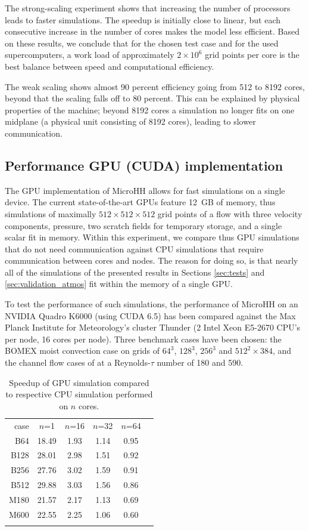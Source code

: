 \documentclass[gmd,manuscript]{copernicus}
\begin{document}
The strong-scaling experiment shows that increasing the number of processors leads to faster simulations. The speedup is initially close to linear, but each consecutive increase in the number of cores makes the model less efficient. Based on these results, we conclude that for the chosen test case and for the used supercomputers, a work load of approximately $2 \times 10^6$ grid points per core is the best balance between speed and computational efficiency.

The weak scaling shows almost 90 percent efficiency going from 512 to 8192 cores, beyond that the scaling falls off to 80 percent. This can be explained by physical properties of the machine;  beyond 8192 cores a simulation no longer fits on one midplane (a physical unit consisting of 8192 cores), leading to slower communication.

\subsection{Performance GPU (CUDA) implementation}
The GPU implementation of MicroHH allows for fast simulations on a single device. The current state-of-the-art GPUs feature 12~GB of memory, thus simulations of maximally $512 \times 512 \times 512$ grid points of a flow with three velocity components, pressure, two scratch fields for temporary storage, and a single scalar fit in memory. Within this experiment, we compare thus GPU simulations that do not need communication against CPU simulations that require communication between cores and nodes. The reason for doing so, is that nearly all of the simulations of the presented results in Sections \ref{sec:tests} and \ref{sec:validation_atmos} fit within the memory of a single GPU.

To test the performance of such simulations, the performance of MicroHH on an NVIDIA Quadro K6000 (using CUDA 6.5) has been compared against the Max Planck Institute for Meteorology's cluster Thunder (2 Intel Xeon E5-2670 CPU's per node, 16 cores per node). Three benchmark cases have been chosen: the BOMEX moist convection case on grids of $64^3$, $128^3$, $256^3$ and $512^2 \times 384$, and the channel flow cases of \citet{Moser1999} at a Reynolds-$\tau$ number of 180 and 590.

\begin{table}[t]
	\caption{Speedup of GPU simulation compared to respective CPU simulation performed on $n$ cores.}\label{tab:gpu}
	\begin{tabular}{rccccc}
		\tophline
		case & $n$=1 & $n$=16 & $n$=32 & $n$=64   \\
		\middlehline
		B64  & 18.49 & 1.93 & 1.14 & 0.95 \\
		B128 & 28.01 & 2.98 & 1.51 & 0.92 \\
		B256 & 27.76 & 3.02 & 1.59 & 0.91 \\
		B512 & 29.88 & 3.03 & 1.56 & 0.86 \\
		\middlehline
		M180 & 21.57 & 2.17 & 1.13 & 0.69 \\
		M600 & 22.55 & 2.25 & 1.06 & 0.60 \\
		\bottomhline
	\end{tabular}
\end{table}
\end{document}
